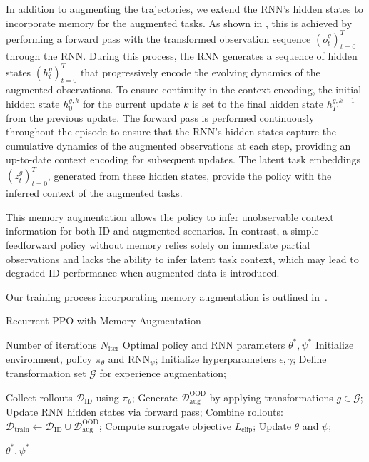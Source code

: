 In addition to augmenting the trajectories, we extend the RNN’s hidden states to incorporate memory for the augmented tasks.
As shown in , this is achieved by performing a forward pass with the transformed observation sequence \( (o_t^g)_{t=0}^{T} \) through the RNN.
During this process, the RNN generates a sequence of hidden states \( (h_t^g)_{t=0}^{T} \) that progressively encode the evolving dynamics of the augmented observations.
To ensure continuity in the context encoding, the initial hidden state \(h_0^{g,k}\) for the current update \(k\) is set to the final hidden state \(h_T^{g,k-1}\) from the previous update. 
The forward pass is performed continuously throughout the episode to ensure that the RNN’s hidden states capture the cumulative dynamics of the augmented observations at each step, providing an up-to-date context encoding for subsequent updates.
The latent task embeddings \( (z_t^g)_{t=0}^{T} \), generated from these hidden states, provide the policy with the inferred context of the augmented tasks.

This memory augmentation allows the policy to infer unobservable context information for both ID and augmented scenarios. 
In contrast, a simple feedforward policy without memory relies solely on immediate partial observations and lacks the ability to infer latent task context, which may lead to degraded ID performance when augmented data is introduced.

Our training process incorporating memory augmentation is outlined in~.

\begin{algorithm}[H]
\caption{Recurrent PPO with Memory Augmentation}
\label{alg:memory_augmented_ppo}
\begin{algorithmic}[1]
\Require Number of iterations $ N_{\text{iter}} $
\Ensure Optimal policy and RNN parameters $ \theta^*, \psi^*$
\State Initialize environment, policy $ \pi_\theta $ and RNN$_{\psi}$;
\State Initialize hyperparameters $ \epsilon, \gamma $;
\State Define transformation set $ \mathcal{G} $ for experience augmentation;

    \State Collect rollouts \( \mathcal{D}_{\text{ID}} \) using \( \pi_\theta \);
    \State Generate  \(\mathcal{D}_{\text{aug}}^{\text{OOD}}\) by applying transformations \(g \in \mathcal{G}\);
    \State Update RNN hidden states via forward pass; 
    \State Combine rollouts: \(\mathcal{D}_{\text{train}}  \gets \mathcal{D}_{\text{ID}} \cup \mathcal{D}_{\text{aug}}^{\text{OOD}}\);
        \State Compute surrogate objective \( L_{\text{clip}} \);
        \State Update \( \theta \) and \(\psi\);
    \EndFor
\EndFor

\State \Return \( \theta^*, \psi^* \)
\end{algorithmic}
\end{algorithm}
